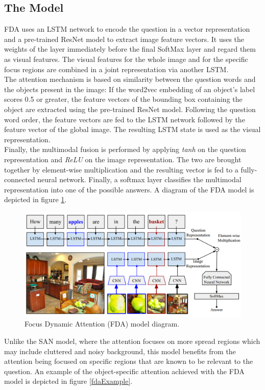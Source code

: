 \documentclass{article}
\begin{document}
\subsection{The Model}
FDA uses an LSTM network to encode the question in a vector representation and a pre-trained ResNet model to extract image feature vectors. It uses the weights of the layer immediately before the final SoftMax layer and regard them as visual features. The visual features for the whole image and for the specific focus regions are combined in a joint representation via another LSTM.\\
The attention mechanism is based on similarity between the question words and the objects present in the image: If the word2vec embedding of an object’s label scores 0.5 or greater, the feature vectors of the bounding box containing the object are extracted using the pre-trained ResNet model. Following the question word order, the feature vectors are fed to the LSTM network followed by the feature vector of the global image. The resulting LSTM state is used as the visual representation.\\
Finally, the multimodal fusion is performed by applying \emph{tanh} on the question representation and \emph{ReLU} on the image representation. The two are brought together by element-wise multiplication and the resulting vector is fed to a fully-connected neural network. Finally, a softmax layer classifies the multimodal representation into one of the possible answers. A diagram of the FDA model is depicted in figure \ref{fdaModel}.

    \begin{figure}[ht]
    	\centering
            \includegraphics[width=0.75\linewidth]{fdaModel.PNG}
    	\caption{Focus Dynamic Attention (FDA) model diagram.}
    	\label{fdaModel}
    \end{figure}

Unlike the SAN model, where the attention focuses on more spread regions which may include cluttered and noisy background, this model benefits from the attention being focused on specific regions that are known to be relevant to the question. An example of the object-specific attention achieved with the FDA model is depicted in figure \ref{fdaExample}.
\end{document}

